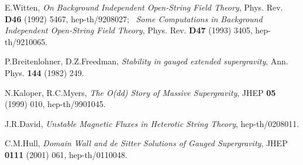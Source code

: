 \documentclass[a4paper,a4paper]{article}
\begin{document}
\begin{thebibliography}{99}
E.Witten, 
{\it On Background Independent Open-String Field Theory}, 
Phys. Rev. {\bf D46} (1992) 5467, hep-th/9208027; \ 
{\it Some Computations in Background Independent Open-String Field Theory}, 
Phys. Rev. {\bf D47} (1993) 3405, hep-th/9210065. 

P.Breitenlohner, D.Z.Freedman, 
{\it Stability in gauged extended supergravity}, 
Ann. Phys. {\bf 144} (1982) 249. 

N.Kaloper, R.C.Myers, 
{\it The O(dd) Story of Massive Supergravity}, 
JHEP {\bf 05} (1999) 010, hep-th/9901045. 

J.R.David, 
{\it Unstable Magnetic Fluxes in Heterotic String Theory}, 
hep-th/0208011. 

C.M.Hull, 
{\it Domain Wall and de Sitter Solutions of Gauged Supergravity}, 
JHEP {\bf 0111} (2001) 061, hep-th/0110048. 




\end{thebibliography}
\end{document}
